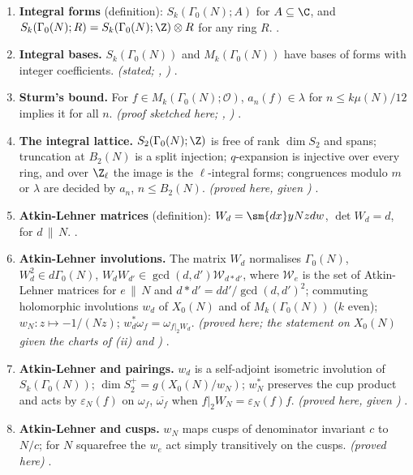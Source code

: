 \begin{enumerate}[label=\textbf{\thechapter.\arabic*}]
\item \textbf{Integral forms} (definition): $S_k(\Gamma_0(N);A)$ for $A\subseteq\C$, and $S_k(\Gamma_0(N);R)=S_k(\Gamma_0(N);\Z)\otimes R$ for any ring $R$. .
\item \textbf{Integral bases.} $S_k(\Gamma_0(N))$ and $M_k(\Gamma_0(N))$ have bases of forms with integer coefficients. \emph{(stated; \cite{Shimura71}, \cite{DiamondShurman})} .
\item \textbf{Sturm's bound.} For $f\in M_k(\Gamma_0(N);\mathcal O)$, $a_n(f)\in\lambda$ for $n\le k\mu(N)/12$ implies it for all $n$. \emph{(proof sketched here; \cite{Sturm87}, \cite{Stein})}
.
\item \textbf{The integral lattice.} $S_2(\Gamma_0(N);\Z)$ is free of rank $\dim S_2$ and spans; truncation at $B_2(N)$ is a split injection; $q$-expansion is injective over every ring, and over $\Z_\ell$ the
image is the $\ell$-integral forms; congruences modulo $m$ or $\lambda$ are decided by $a_n$, $n\le B_2(N)$. \emph{(proved here, given )}
.
\item \textbf{Atkin-Lehner matrices} (definition): $W_d=\sm{dx}y{Nz}{dw}$, $\det W_d=d$, for $d\,\|\,N$. .
\item \textbf{Atkin-Lehner involutions.} The matrix $W_d$ normalises $\Gamma_0(N)$, $W_d^2\in d\Gamma_0(N)$, $W_dW_{d'}\in\gcd(d,d')\mathcal W_{d*d'}$, where $\mathcal W_e$ is the set of Atkin-Lehner matrices for $e\,\|\,N$ and $d*d'=dd'/\gcd(d,d')^2$; commuting holomorphic involutions $w_d$ of $X_0(N)$ and of
$M_k(\Gamma_0(N))$ ($k$ even); $w_N\colon z\mapsto-1/(Nz)$; $w_d^*\omega_f=\omega_{f|_2W_d}$. \emph{(proved here; the statement on $X_0(N)$ given the charts of (ii) and )} .
\item \textbf{Atkin-Lehner and pairings.} $w_d$ is a self-adjoint isometric involution of $S_k(\Gamma_0(N))$; $\dim S_2^+=g(X_0(N)/w_N)$; $w_N^*$ preserves the cup product and acts by $\varepsilon_N(f)$ on
$\omega_f$, $\overline{\omega_f}$ when $f|_2W_N=\varepsilon_N(f)f$. \emph{(proved here, given )} .
\item \textbf{Atkin-Lehner and cusps.} $w_N$ maps cusps of denominator invariant $c$ to $N/c$; for $N$ squarefree the $w_e$ act simply transitively on the cusps. \emph{(proved here)}
.
\end{enumerate}

